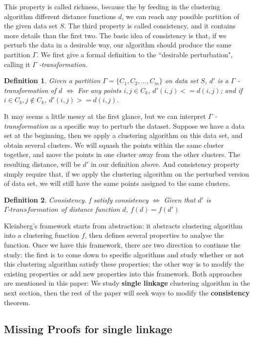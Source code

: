 \documentclass{uonmathreport}
\newtheorem{definition}{Definition}[section]
\begin{document}
This property is called richness, because the by feeding in the clustering algorithm different distance functions $d$, we can reach any possible partition of the given data set $S$. The third property is called consistency, and it contains more details than the first two. The basic idea of consistency is that, if we perturb the data in a desirable way, our algorithm should produce the same partition $\Gamma$. We first give a formal definition to the ``desirable perturbation", calling it $\Gamma$ \textit{-transformation}.
\begin{definition}
Given a partition $\Gamma=\{C_1,C_2,...,C_m\}$ on data set $S$, 
$d'$ is a $\Gamma$ \textit{-transformation} of $d$ $\iff$ For any points $i,j\in C_k$, $d'(i,j)<=d(i,j)$; and if $i \in C_k, j\notin C_k$, $d'(i,j)>=d(i,j)$.
\end{definition}

It may seems a little messy at the first glance, but we can interpret $\Gamma$ \textit{-transformation} as a specific way to perturb the dataset. Suppose we have a data set at the beginning, then we apply a clustering algorithm on this data set, and obtain several clusters. We will squash the points within the same cluster together, and move the points in one cluster away from the other clusters. The resulting distance, will be $d'$ in our definition above. And consistency property simply require that, if we apply the clustering algorithm on the perturbed version of data set, we will still have the same points assigned to the same clusters.

\begin{definition}
Consistency. f satisfy consistency $\iff$ Given that $d'$ is $\Gamma \textit{-transformation}$ of distance function $d$, $f(d) = f(d')$
\end{definition}

Kleinberg's framework starts from abstraction: it abstracts clustering algorithm into a clustering function $f$, then defines several properties to analyse the function. Once we have this framework, there are two direction to continue the study: the first is to come down to specific algorithms and study whether or not this clustering algorithm satisfy these properties; the other way is to modify the existing properties or add new properties into this framework. Both approaches are mentioned in this paper: We study \textbf{single linkage} clustering algorithm in the next section, then the rest of the paper will seek ways to modify the \textbf{consistency} theorem.
\subsection{Missing Proofs for single linkage} \label{subsec:Single-linkage}
\end{document}
